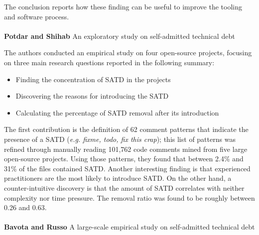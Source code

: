 The conclusion reports how these finding can be useful to improve the tooling and software process.
\\
\\%
\textbf{Potdar and Shihab} \cite{potdar2014exploratory} An exploratory study on self-admitted technical debt

The authors conducted an empirical study on four open-source projects, focusing on three main research questions reported in the following summary:
\begin{itemize}
    \item Finding the concentration of SATD in the projects
    \item Discovering the reasons for introducing the SATD
    \item Calculating the percentage of SATD removal after its introduction
\end{itemize}

The first contribution is the definition of 62 comment patterns that indicate the presence of a SATD (\emph{e.g. fixme, todo, fix this crap}); this list of patterns was refined through manually reading 101,762 code comments mined from five large open-source projects. 
Using those patterns, they found that between 2.4\% and 31\% of the files contained SATD. Another interesting finding is that experienced practitioners are the most likely to introduce SATD. On the other hand, a counter-intuitive discovery is that the amount of SATD correlates with neither complexity nor time pressure. The removal ratio was found to be roughly between 0.26 and 0.63.
\\
\\
\textbf{Bavota and Russo} \cite{bavota2016large} A large-scale empirical study on self-admitted technical debt

